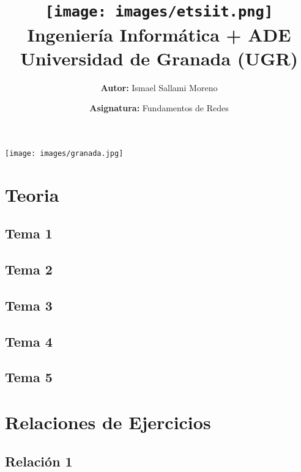 \documentclass[a4paper,12pt]{article}
\title{
    \vspace{-2cm}
    \texttt{[image: images/etsiit.png]} \\ %
    \LARGE Ingeniería Informática + ADE\\
    \large Universidad de Granada (UGR)\\[1cm]
}
\author{\textbf{Autor:} Ismael Sallami Moreno}
\date{\textbf{Asignatura:} Fundamentos de Redes}
\begin{document}
\maketitle
\thispagestyle{empty}

\begin{center}
    \texttt{[image: images/granada.jpg]} \\ %
    \vfill
\end{center}

\newpage

\tableofcontents
\newpage

\section{Teoria}
\subsection{Tema 1}


\subsection{Tema 2}


\subsection{Tema 3}


\subsection{Tema 4}


\subsection{Tema 5}


\section{Relaciones de Ejercicios}
\subsection{Relación 1}

\end{document}
